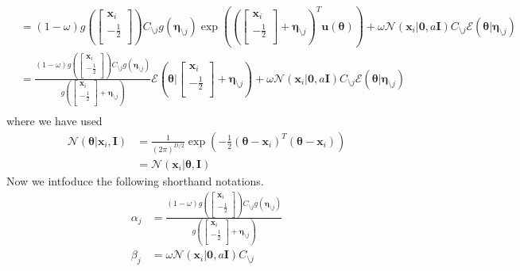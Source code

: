 \documentclass[a4]{article}
\begin{document}
\begin{equation}
\begin{aligned}
&=
(1-\omega)
g(\begin{bmatrix}\bm{x}_i\\-\frac{1}{2}\\\end{bmatrix})
C_{\setminus j}g(\bm{\eta}_{\setminus j})
\exp\left( (\begin{bmatrix}\bm{x}_i\\-\frac{1}{2}\\\end{bmatrix} + \bm{\eta}_{\setminus j})^T \bm{u}(\bm{\theta})\right)
+ \omega\mathcal{N}(\bm{x}_i|\bm{0},a\bm{I}) C_{\setminus j}\mathcal{E}(\bm{\theta}|\bm{\eta}_{\setminus j})\\
&=
\frac{ (1-\omega)g(\begin{bmatrix}\bm{x}_i\\-\frac{1}{2}\\\end{bmatrix})C_{\setminus j}g(\bm{\eta}_{\setminus j}) }
     { g(\begin{bmatrix}\bm{x}_i\\-\frac{1}{2}\\\end{bmatrix} + \bm{\eta}_{\setminus j}) }
\mathcal{E}\left(\bm{\theta}| \begin{bmatrix}\bm{x}_i\\-\frac{1}{2}\\\end{bmatrix} + \bm{\eta}_{\setminus j}\right)
+ \omega\mathcal{N}(\bm{x}_i|\bm{0},a\bm{I}) C_{\setminus j}\mathcal{E}(\bm{\theta}|\bm{\eta}_{\setminus j})\\
\end{aligned}
\end{equation}
where we have used 
\begin{equation}
\begin{aligned}
\mathcal{N}(\bm{\theta}|\bm{x}_i,\bm{I})
&=\frac{1}{(2\pi)^{D/2}}\exp\left(-\frac{1}{2}(\bm{\theta} - \bm{x}_i)^T(\bm{\theta} - \bm{x}_i)\right)\\
&=\mathcal{N}(\bm{x}_i|\bm{\theta}, \bm{I})
\end{aligned}
\end{equation}
Now we intfoduce the following shorthand notations.
\begin{equation}
\begin{aligned}
\alpha_j &= 
\frac{ (1-\omega)g(\begin{bmatrix}\bm{x}_i\\-\frac{1}{2}\\\end{bmatrix})C_{\setminus j}g(\bm{\eta}_{\setminus j}) }
     { g(\begin{bmatrix}\bm{x}_i\\-\frac{1}{2}\\\end{bmatrix} + \bm{\eta}_{\setminus j}) }\\
\beta_j &= \omega\mathcal{N}(\bm{x}_i|\bm{0},a\bm{I}) C_{\setminus j}
\end{aligned}
\end{equation}
\end{document}
